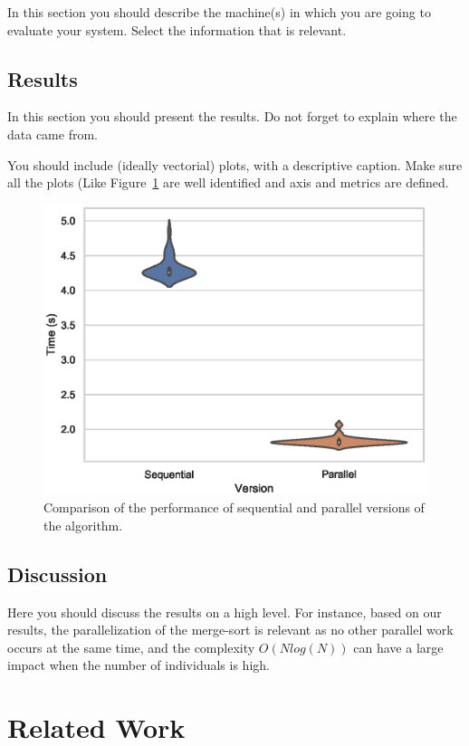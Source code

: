 \documentclass[runningheads]{llncs}
\begin{document}
In this section you should describe the machine(s) in which you are going to evaluate your system. Select the information that is relevant.


\subsection{Results}

In this section you should present the results. Do not forget to explain where the data came from. 

You should include (ideally vectorial) plots, with a descriptive caption. Make sure all the plots (Like Figure~\ref{fig1} are well identified and axis and metrics are defined.

\begin{figure}[htbp]
\includegraphics[width=\textwidth]{code/performance.eps}
\caption{Comparison of the performance of sequential and parallel versions of the algorithm.} \label{fig1}
\end{figure}


\subsection{Discussion}

Here you should discuss the results on a high level. For instance, based on our results, the parallelization of the merge-sort is relevant as no other parallel work occurs at the same time, and the complexity $O(N log(N))$ can have a large impact when the number of individuals is high.

\section{Related Work}
\end{document}
